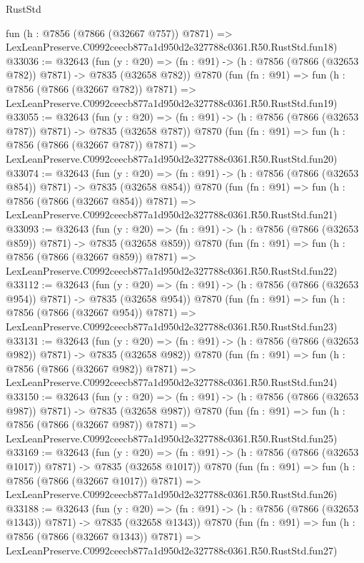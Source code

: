 \begin{lexlean}{RustStd}
\begin{coremodule}
    fun (h : @7856 (@7866 (@32667 @757)) @7871) =>
    LexLeanPreserve.C0992ceecb877a1d950d2e327788c0361.R50.RustStd.fun18)
@33036 := @32643
    (fun (y : @20) => (fn : @91) -> (h : @7856 (@7866 (@32653 @782)) @7871) -> @7835 (@32658 @782))
    @7870
    (fun (fn : @91) =>
    fun (h : @7856 (@7866 (@32667 @782)) @7871) =>
    LexLeanPreserve.C0992ceecb877a1d950d2e327788c0361.R50.RustStd.fun19)
@33055 := @32643
    (fun (y : @20) => (fn : @91) -> (h : @7856 (@7866 (@32653 @787)) @7871) -> @7835 (@32658 @787))
    @7870
    (fun (fn : @91) =>
    fun (h : @7856 (@7866 (@32667 @787)) @7871) =>
    LexLeanPreserve.C0992ceecb877a1d950d2e327788c0361.R50.RustStd.fun20)
@33074 := @32643
    (fun (y : @20) => (fn : @91) -> (h : @7856 (@7866 (@32653 @854)) @7871) -> @7835 (@32658 @854))
    @7870
    (fun (fn : @91) =>
    fun (h : @7856 (@7866 (@32667 @854)) @7871) =>
    LexLeanPreserve.C0992ceecb877a1d950d2e327788c0361.R50.RustStd.fun21)
@33093 := @32643
    (fun (y : @20) => (fn : @91) -> (h : @7856 (@7866 (@32653 @859)) @7871) -> @7835 (@32658 @859))
    @7870
    (fun (fn : @91) =>
    fun (h : @7856 (@7866 (@32667 @859)) @7871) =>
    LexLeanPreserve.C0992ceecb877a1d950d2e327788c0361.R50.RustStd.fun22)
@33112 := @32643
    (fun (y : @20) => (fn : @91) -> (h : @7856 (@7866 (@32653 @954)) @7871) -> @7835 (@32658 @954))
    @7870
    (fun (fn : @91) =>
    fun (h : @7856 (@7866 (@32667 @954)) @7871) =>
    LexLeanPreserve.C0992ceecb877a1d950d2e327788c0361.R50.RustStd.fun23)
@33131 := @32643
    (fun (y : @20) => (fn : @91) -> (h : @7856 (@7866 (@32653 @982)) @7871) -> @7835 (@32658 @982))
    @7870
    (fun (fn : @91) =>
    fun (h : @7856 (@7866 (@32667 @982)) @7871) =>
    LexLeanPreserve.C0992ceecb877a1d950d2e327788c0361.R50.RustStd.fun24)
@33150 := @32643
    (fun (y : @20) => (fn : @91) -> (h : @7856 (@7866 (@32653 @987)) @7871) -> @7835 (@32658 @987))
    @7870
    (fun (fn : @91) =>
    fun (h : @7856 (@7866 (@32667 @987)) @7871) =>
    LexLeanPreserve.C0992ceecb877a1d950d2e327788c0361.R50.RustStd.fun25)
@33169 := @32643
    (fun (y : @20) =>
    (fn : @91) -> (h : @7856 (@7866 (@32653 @1017)) @7871) -> @7835 (@32658 @1017))
    @7870
    (fun (fn : @91) =>
    fun (h : @7856 (@7866 (@32667 @1017)) @7871) =>
    LexLeanPreserve.C0992ceecb877a1d950d2e327788c0361.R50.RustStd.fun26)
@33188 := @32643
    (fun (y : @20) =>
    (fn : @91) -> (h : @7856 (@7866 (@32653 @1343)) @7871) -> @7835 (@32658 @1343))
    @7870
    (fun (fn : @91) =>
    fun (h : @7856 (@7866 (@32667 @1343)) @7871) =>
    LexLeanPreserve.C0992ceecb877a1d950d2e327788c0361.R50.RustStd.fun27)

\end{coremodule}
\end{lexlean}
